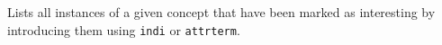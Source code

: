  

Lists all instances of a given concept that have been marked as
interesting by introducing them using {\tt indi} or {\tt attrterm}.


